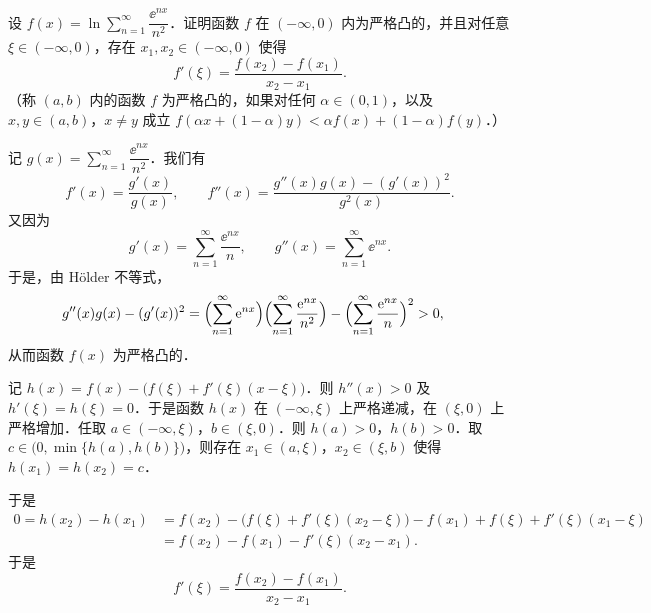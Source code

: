 设 $f(x)=\ln\sum\limits_{n=1}^{\infty}\dfrac{\ee^{nx}}{n^2}$．证明函数 $f$ 在 $(-\infty,0)$ 内为严格凸的，并且对任意 $\xi\in(-\infty,0)$，存在 $x_1,x_2\in(-\infty,0)$ 使得
\[
  f'(\xi)=\frac{f(x_2)-f(x_1)}{x_2-x_1}.
\]
（称 $(a,b)$ 内的函数 $f$ 为严格凸的，如果对任何 $\alpha\in(0,1)$，以及 $x,y\in(a,b)$，$x\ne y$ 成立 $f(\alpha x+(1-\alpha)y)<\alpha f(x)+(1-\alpha)f(y)$．）
\begin{solution}
记 $g(x)=\sum\limits_{n=1}^{\infty}\dfrac{\ee^{nx}}{n^2}$．我们有
\[
  f'(x)=\frac{g'(x)}{g(x)},\qquad
  f''(x)=\frac{g''(x)g(x)-(g'(x))^2}{g^2(x)}.
\]
又因为
\[
  g'(x)=\sum_{n=1}^{\infty}\frac{\ee^{nx}}{n},\qquad
  g''(x)=\sum_{n=1}^{\infty}\ee^{nx}.
\]
于是，由 Hölder 不等式，
\begin{align*}
  g''(x)g(x)-(g'(x))^2&=\Bigl(\sum_{n=1}^{\infty}\mathrm{e}^{nx}\Bigr)\Bigl(\sum_{n=1}^{\infty}\frac{\mathrm{e}^{nx}}{n^2}\Bigr)-\Bigl(\sum_{n=1}^{\infty}\frac{\mathrm{e}^{nx}}{n}\Bigr)^2>0,
\end{align*}
从而函数 $f(x)$ 为严格凸的．

记 $h(x)=f(x)-\bigl(f(\xi)+f'(\xi)(x-\xi)\bigr)$．则 $h''(x)>0$ 及 $h'(\xi)=h(\xi)=0$．于是函数 $h(x)$ 在 $(-\infty,\xi)$ 上严格递减，在 $(\xi,0)$ 上严格增加．任取 $a\in(-\infty,\xi)$，$b\in(\xi,0)$．则 $h(a)>0$，$h(b)>0$．取 $c\in\bigl(0,\min\{h(a),h(b)\}\bigr)$，则存在 $x_1\in(a,\xi)$，$x_2\in(\xi,b)$ 使得 $h(x_1)=h(x_2)=c$．

于是
\begin{align*}
  0=h(x_2)-h(x_1)&=f(x_2)-\bigl(f(\xi)+f'(\xi)(x_2-\xi)\bigr)-f(x_1)+f(\xi)+f'(\xi)(x_1-\xi)\\
  &=f(x_2)-f(x_1)-f'(\xi)(x_2-x_1).
\end{align*}
于是
\[
  f'(\xi)=\frac{f(x_2)-f(x_1)}{x_2-x_1}.
\]
\end{solution}
